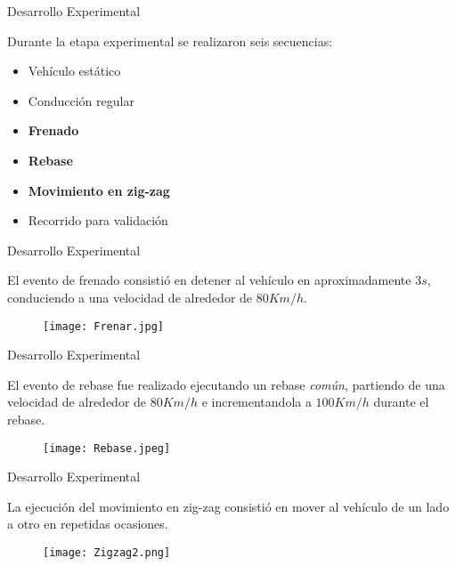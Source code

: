 \documentclass[14pt]{beamer}
\begin{document}
\begin{frame}{Desarrollo Experimental}

Durante la etapa experimental se realizaron seis secuencias:\\
\vskip 10pt
\begin{itemize}
\item Vehículo estático
\item Conducción regular
\item {\large\bf\textcolor[rgb]{0,0,.55}{Frenado}}
\item {\large\bf\textcolor[rgb]{0,0,.55}{Rebase}}
\item {\large\bf\textcolor[rgb]{0,0,.55}{Movimiento en zig-zag}}
\item Recorrido para validación
\end{itemize}

\end{frame}



\begin{frame}{Desarrollo Experimental}

El evento de frenado consistió en detener al vehículo en aproximadamente $3s$, conduciendo a una velocidad de alrededor de $80Km/h$.

\begin{figure}[H]
\texttt{[image: Frenar.jpg]}
\end{figure}

\end{frame}



\begin{frame}{Desarrollo Experimental}

El evento de rebase fue realizado ejecutando un rebase {\em común}, partiendo de una velocidad de alrededor de $80Km/h$ e incrementandola a $100Km/h$ durante el rebase.

\begin{figure}[H]
\texttt{[image: Rebase.jpeg]}
\end{figure}

\end{frame}



\begin{frame}{Desarrollo Experimental}

La ejecución del movimiento en zig-zag consistió en mover al vehículo de un lado a otro en repetidas ocasiones.

\begin{figure}[H]
\texttt{[image: Zigzag2.png]}
\end{figure}

\end{frame}
\end{document}
